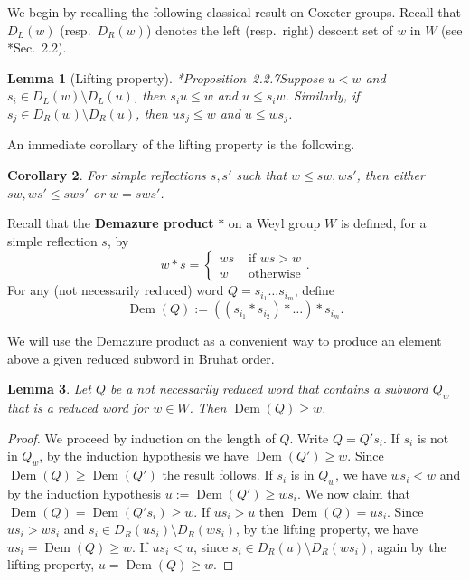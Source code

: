 \documentclass[12pt,reqno]{amsart}
\newtheorem{lemma}{Lemma}[section]
\newtheorem{cor}[lemma]{Corollary}
\theoremstyle{definition}
\newcommand{\dem}{\operatorname{Dem}}
\begin{document}
{We begin by recalling the following classical result on Coxeter groups.
Recall that \(D_L(w)\) (resp.\ \(D_R(w)\)) denotes the left (resp.\ right) descent set of \(w\) in \(W\) (see \cite{BB2005}*{Sec.~2.2}).

\begin{lemma}[Lifting property]\cite{BB2005}*{Proposition~2.2.7}\label{lemma:lift}
    Suppose $u< w$ and $s_i\in D_{L}(w)\setminus D_{L}(u)$, then $s_iu\leq w$ and $u\leq s_iw$. Similarly, if $s_j\in D_{R}(w)\setminus D_{R}(u)$, then $us_j\leq w$ and $u\leq ws_j$.
\end{lemma}
An immediate corollary of the lifting property is the following.
\begin{cor}\label{cor:lift}
    For simple reflections $s,s'$ such that $w\leq sw,ws'$, then either $sw,ws'\leq sws'$ or $w = sws'$. 
\end{cor}

Recall that the \textbf{Demazure product} $\ast$ on a Weyl group $W$ is defined, for a simple reflection $s$, by
\begin{equation}
    w\ast s = \begin{cases}
        ws & \text{ if }ws>w\\
        w & \text{ otherwise}
    \end{cases}.
\end{equation}
For any (not necessarily reduced) word $Q = s_{i_1}\dots s_{i_m}$, define 
\[\dem(Q):= ((s_{i_1}\ast s_{i_2})\ast \dots)\ast s_{i_m}.\]

We will use the Demazure product as a convenient way to produce an element above a given reduced subword in Bruhat order.

\begin{lemma}
\label{lem:dem}
    Let $Q$ be a not necessarily reduced word that contains a subword $Q_w$ that is a reduced word for $w\in W$. Then $\dem(Q)\ge w$.
\end{lemma}
\begin{proof}We proceed by induction on the length of $Q$. 
    Write $Q=Q' s_{i}$. If $s_{i}$ is not in $Q_w$, by the induction hypothesis we have $\dem(Q')\ge w$. Since $\dem(Q)\ge \dem(Q')$ the result follows. If $s_{i}$ is in $Q_w$, we have $ws_{i}<w$ and by the induction hypothesis $u:=\dem(Q')\ge ws_{i}$. We now claim that $\dem(Q)=\dem(Q's_i)\ge w$.  If $us_i>u$ then $\dem(Q)=us_i$. Since $us_i>ws_i$ and $s_i\in D_{R}(us_i)\setminus D_{R}(ws_i)$, by the lifting property, we have $us_i = \dem(Q)\ge w$.
    If $us_i<u$,
    since $s_i\in D_{R}(u)\setminus D_{R}(ws_i)$, again by the lifting property, $u = \dem(Q)\geq w$.
\end{proof}

}
\end{document}
